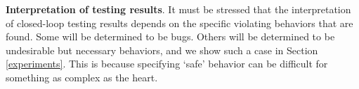 
\textbf{Interpretation of testing results}.
It must be stressed that the interpretation of closed-loop testing results depends on the specific violating behaviors that are found.
Some will be determined to be bugs. 
Others will be determined to be undesirable but necessary behaviors, and we show such a case in Section \ref{experiments}.
This is because specifying `safe' behavior can be difficult for something as complex as the heart.
